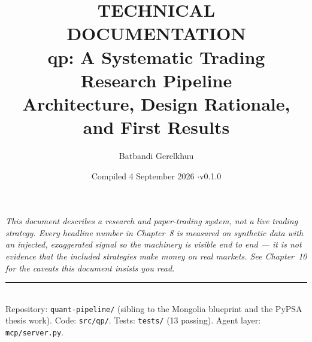 \documentclass[11pt,openany]{report}
\title{\vspace{-1.5cm}
  {\color{QpAmber}\large\bfseries TECHNICAL DOCUMENTATION}\\[6pt]
  {\color{QpSteelDark}\Huge\bfseries qp: A Systematic Trading\\ Research Pipeline}\\[10pt]
  {\color{QpInk}\large Architecture, Design Rationale, and First Results}}
\author{Batbandi Gerelkhuu}
\date{Compiled 4 September 2026 \quad$\cdot$\quad v0.1.0}
\begin{document}
\maketitle
\thispagestyle{empty}

\begin{center}
\begin{minipage}{0.86\textwidth}
\small\itshape\color{QpGrey}
This document describes a research and paper-trading system, not a live trading
strategy. Every headline number in Chapter~8 is measured on synthetic data with
an injected, exaggerated signal so the machinery is visible end to end --- it is
not evidence that the included strategies make money on real markets. See
Chapter~10 for the caveats this document insists you read.
\end{minipage}
\end{center}

\vfill
\noindent\rule{\textwidth}{0.4pt}\\[2pt]
{\footnotesize\color{QpGrey}Repository: \texttt{quant-pipeline/} (sibling to the
Mongolia blueprint and the PyPSA thesis work). Code: \texttt{src/qp/}. Tests:
\texttt{tests/} (13 passing). Agent layer: \texttt{mcp/server.py}.}

\clearpage
\tableofcontents
\clearpage














\appendix

\end{document}
